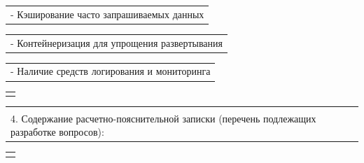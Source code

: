 \documentclass[12pt, А4, twoside]{article}
\begin{document}
\begin{FlushLeft}
    \vspace{-0.1 cm}

    \begin{tabular}{p{17.25cm}}
        \hspace{0.6cm} \textsf{- Кэширование часто запрашиваемых данных}\vspace{0pt} \hline \\
    \end{tabular}

    \vspace{-0.1 cm}

    \begin{tabular}{p{17.25cm}}
        \hspace{0.6cm} \textsf{- Контейнеризация для упрощения развертывания}\vspace{0pt} \hline \\
    \end{tabular}

    \vspace{-0.1 cm}

    \begin{tabular}{p{17.25cm}}
        \hspace{0.6cm} \textsf{- Наличие средств логирования и мониторинга}\vspace{0pt} \hline \\
    \end{tabular}

    \begin{tabular}{p{17.25cm}}
        \vspace{0pt} \hline \\
    \end{tabular}

    \vspace{-0.1 cm}

    \begin{tabular}{p{17.25cm}}
        \vspace{0.1cm} \hline \\
        \textsf{4. Содержание расчетно-пояснительной записки (перечень подлежащих разработке вопросов):} \vspace{0pt} \hline \\
    \end{tabular}

    \begin{tabular}{p{17.25cm}}
        \vspace{0pt} \hline \\
    \end{tabular}


\end{FlushLeft}
\end{document}

